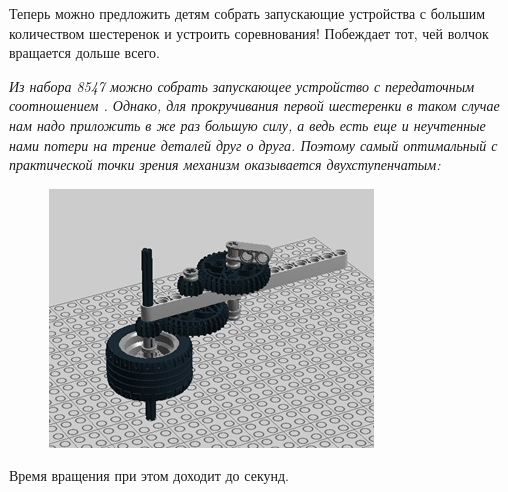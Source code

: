 Теперь можно предложить детям собрать запускающие устройства с большим количеством шестеренок и устроить соревнования! Побеждает тот, чей волчок вращается дольше всего.

{\slshape Из набора 8547 можно собрать запускающее устройство с передаточным соотношением . Однако, для прокручивания первой шестеренки в таком случае нам надо приложить в  же раз большую силу, а ведь есть еще и неучтенные нами потери на трение деталей друг о друга. Поэтому самый оптимальный с практической точки зрения механизм оказывается двухступенчатым:	
	\begin{figure}[h!]
		\begin{center}
			\includegraphics[width=1\linewidth]{chapters/chapter6/images/9}
			\caption{}
			\label{ris:image6x9}
		\end{center}
	\end{figure}
	
	Время вращения при этом доходит до  секунд.}